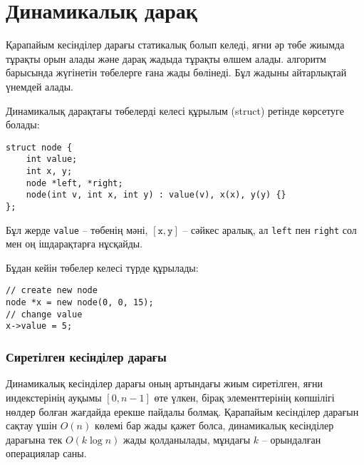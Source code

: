 \section{Динамикалық дарақ}


Қарапайым кесінділер дарағы статикалық болып келеді,
яғни әр төбе жиымда тұрақты орын алады және
дарақ жадыда тұрақты өлшем алады. 
алгоритм барысында жүгінетін төбелерге ғана жады бөлінеді. 
Бұл жадыны айтарлықтай үнемдей алады.


Динамикалық дарақтағы төбелерді келесі құрылым (struct) ретінде көрсетуге болады:
\begin{lstlisting}
struct node {
    int value;
    int x, y;
    node *left, *right;
    node(int v, int x, int y) : value(v), x(x), y(y) {}
};
\end{lstlisting}
Бұл жерде \texttt{value} -- төбенің мәні,
$[\texttt{x},\texttt{y}]$ -- сәйкес аралық,
ал \texttt{left} пен \texttt{right} сол мен оң ішдарақтарға нұсқайды.

Бұдан кейін төбелер келесі түрде құрылады:
\begin{lstlisting}
// create new node
node *x = new node(0, 0, 15);
// change value
x->value = 5;
\end{lstlisting}

\subsubsection{Сиретілген кесінділер дарағы}

Динамикалық кесінділер дарағы оның артындағы жиым сиретілген, яғни
индекстерінің ауқымы $[0,n-1]$ өте үлкен, бірақ
элементтерінің көпшілігі нөлдер болған жағдайда ерекше пайдалы болмақ. Қарапайым кесінділер дарағын сақтау үшін
$O(n)$ көлемі бар жады қажет болса, динамикалық кесінділер дарағына тек
$O(k \log n)$ жады қолданылады, мұндағы $k$ -- орындалған 
операциялар саны.



